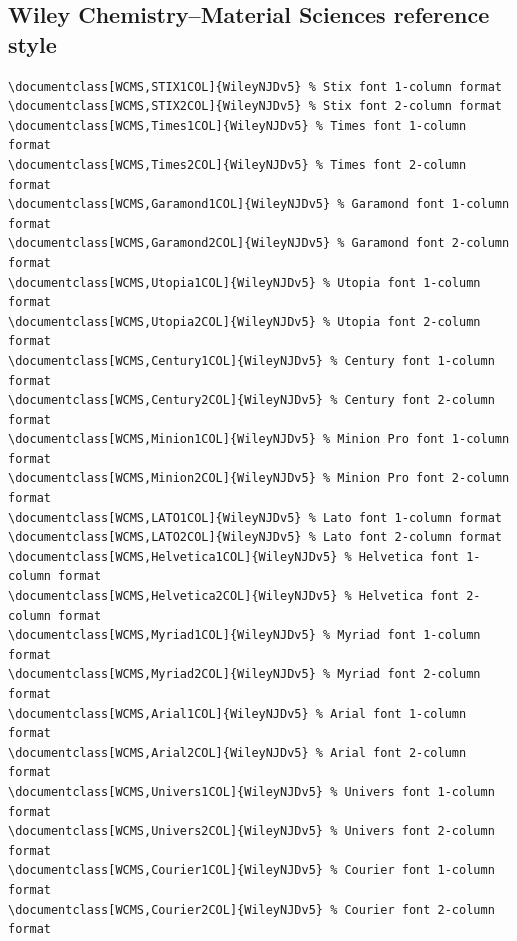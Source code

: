 \documentclass[11pt]{article}
\begin{document}
\subsection*{Wiley Chemistry--Material Sciences reference style}
{\fontsize{9}{10}\selectfont\begin{verbatim}
\documentclass[WCMS,STIX1COL]{WileyNJDv5} % Stix font 1-column format
\documentclass[WCMS,STIX2COL]{WileyNJDv5} % Stix font 2-column format
\documentclass[WCMS,Times1COL]{WileyNJDv5} % Times font 1-column format
\documentclass[WCMS,Times2COL]{WileyNJDv5} % Times font 2-column format
\documentclass[WCMS,Garamond1COL]{WileyNJDv5} % Garamond font 1-column format
\documentclass[WCMS,Garamond2COL]{WileyNJDv5} % Garamond font 2-column format
\documentclass[WCMS,Utopia1COL]{WileyNJDv5} % Utopia font 1-column format
\documentclass[WCMS,Utopia2COL]{WileyNJDv5} % Utopia font 2-column format
\documentclass[WCMS,Century1COL]{WileyNJDv5} % Century font 1-column format
\documentclass[WCMS,Century2COL]{WileyNJDv5} % Century font 2-column format
\documentclass[WCMS,Minion1COL]{WileyNJDv5} % Minion Pro font 1-column format
\documentclass[WCMS,Minion2COL]{WileyNJDv5} % Minion Pro font 2-column format
\documentclass[WCMS,LATO1COL]{WileyNJDv5} % Lato font 1-column format
\documentclass[WCMS,LATO2COL]{WileyNJDv5} % Lato font 2-column format
\documentclass[WCMS,Helvetica1COL]{WileyNJDv5} % Helvetica font 1-column format
\documentclass[WCMS,Helvetica2COL]{WileyNJDv5} % Helvetica font 2-column format
\documentclass[WCMS,Myriad1COL]{WileyNJDv5} % Myriad font 1-column format
\documentclass[WCMS,Myriad2COL]{WileyNJDv5} % Myriad font 2-column format
\documentclass[WCMS,Arial1COL]{WileyNJDv5} % Arial font 1-column format
\documentclass[WCMS,Arial2COL]{WileyNJDv5} % Arial font 2-column format
\documentclass[WCMS,Univers1COL]{WileyNJDv5} % Univers font 1-column format
\documentclass[WCMS,Univers2COL]{WileyNJDv5} % Univers font 2-column format
\documentclass[WCMS,Courier1COL]{WileyNJDv5} % Courier font 1-column format
\documentclass[WCMS,Courier2COL]{WileyNJDv5} % Courier font 2-column format
\end{verbatim}}
\end{document}

